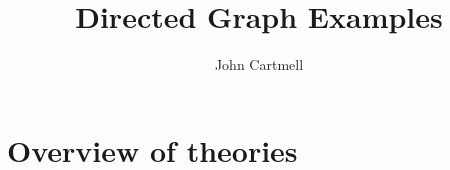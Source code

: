\documentclass[10pt,a4paper]{article}
\theoremstyle{remark}
\begin{document}
\title{Directed Graph Examples}


\author{John Cartmell}

\date{}


\newcommand{\seenudgeup}[1]{\rule{0.1cm}{#1}}
\newcommand{\seenudgedown}[1]{\rule[-#1]{0.1cm}{0.1cm}}
\newcommand{\nudgeup}[1]{\rule{0cm}{#1}}
\newcommand{\nudgedown}[1]{\rule[-#1]{0cm}{0.1cm}}

\newcommand{\stringtype}{text}
\newcommand{\numbertype}{number}


\section{Overview of theories}
\iffalse
\end{document}
